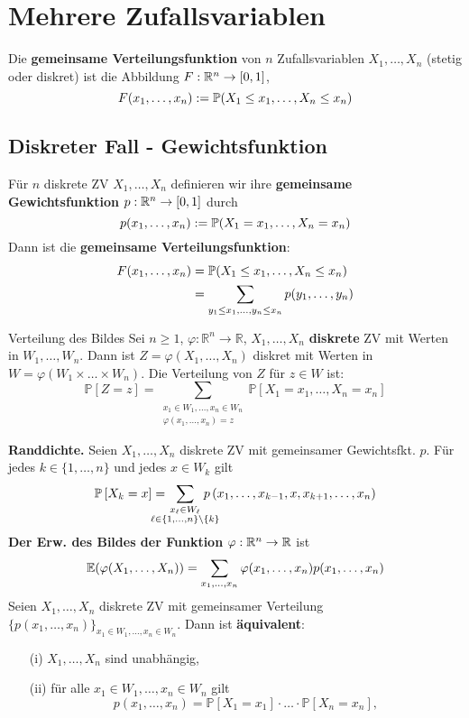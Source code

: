 \section{Mehrere Zufallsvariablen}
\begin{mainbox}{}
    Die \textbf{gemeinsame Verteilungsfunktion} von $n$ Zufallsvariablen $X_1, \ldots, X_n$ (stetig oder diskret) ist die Abbildung $F: \R^n \to [0,1]$,
    $$F(x_1, \ldots, x_n) := \P(X_1 \leq x_1, \ldots, X_n \leq x_n)$$
\end{mainbox}
\subsection{Diskreter Fall - Gewichtsfunktion}
    Für $n$ diskrete ZV $X_1, \ldots, X_n$ definieren wir ihre \textbf{gemeinsame Gewichtsfunktion} $p: \R^n \to [0,1]$ durch
    $$p(x_1, \ldots, x_n) := \P(X_1 = x_1, \ldots, X_n = x_n)$$
    Dann ist die \textbf{gemeinsame Verteilungsfunktion}:
    \begin{align*}
        F(x_1, \ldots, x_n) &= \P(X_1 \leq x_1, \ldots, X_n \leq x_n)\\
        &= \sum_{y_1 \leq x_1, \ldots, y_n \leq x_n}p(y_1, \ldots,y_n)
    \end{align*}    

\begin{subbox}{Verteilung des Bildes}
Sei $n \geq 1$, $\varphi: \mathbb{R}^n \rightarrow \mathbb{R}$, $X_1, \ldots, X_n$ \textbf{diskrete} ZV mit Werten in $W_1, \ldots, W_n$. Dann ist $Z=\varphi(X_1, \ldots, X_n)$ diskret mit Werten in $W=\varphi(W_1 \times \ldots \times W_n)$. Die Verteilung von $Z$ für $z \in W$ ist:
$$
\mathbb{P}[Z=z]=\sum_{\substack{x_1 \in W_1, \ldots, x_n \in W_n \\ \varphi(x_1, \ldots, x_n)=z}} \mathbb{P}[X_1=x_1, \ldots, X_n=x_n]
$$
\end{subbox}

\textbf{Randdichte.} Seien $X_1, \ldots, X_n$ diskrete ZV mit gemeinsamer Gewichtsfkt. $p$. Für jedes $k \in\{1, \ldots, n\}$ und jedes $x \in W_k$ gilt
$$
\mathbb{P}\left[X_k=x\right]= \hspace{-0.5cm} \sum_{\substack{x_{\ell} \in W_{\ell} \\ \ell \in\{1, \ldots, n\} \backslash\{k\}}} \hspace{-0.5cm} p\left(x_1, \ldots, x_{k-1}, x, x_{k+1}, \ldots, x_n\right)
$$
\textbf{Der Erw. des Bildes der Funktion} $\varphi: \R^n \to \R$ ist
    $$\E(\varphi(X_1, \ldots, X_n)) = \sum_{x_1, \ldots, x_n}\varphi(x_1, \ldots, x_n)p(x_1, \ldots, x_n)$$
Seien $X_1, \ldots, X_n$ diskrete ZV mit gemeinsamer Verteilung $\{p(x_1, \ldots, x_n)\}_{x_1 \in W_1, \ldots, x_n \in W_n}$. Dann ist \textbf{äquivalent}:
\begin{itemize}
    \item[(i)] $X_1, \ldots, X_n$ sind unabhängig,
    \item[(ii)] für alle $x_1 \in W_1, \ldots, x_n \in W_n$ gilt
    $$
    p(x_1, \ldots, x_n)=\mathbb{P}[X_1=x_1] \cdot \ldots \cdot \mathbb{P}[X_n=x_n],
    $$
\end{itemize}
